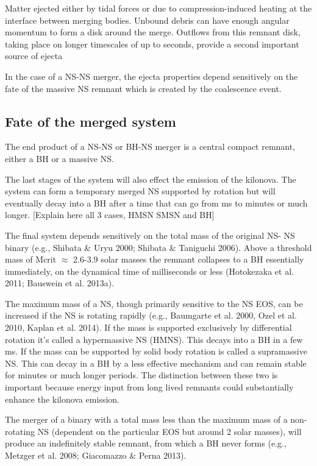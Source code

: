 Matter ejected either by tidal forces or due to compression-induced heating at the interface between merging bodies.
Unbound debris can have enough angular momentum to form a disk around the merge.
Outflows from this remnant disk, taking place on longer timescales of up to seconds, provide a second important source of ejecta

In the case of a NS-NS merger, the ejecta properties depend sensitively on the fate of the massive NS remnant which is created by the coalescence event.

\subsection{Fate of the merged system}

The end product of a NS-NS or BH-NS merger is a central compact remnant, either a BH or a massive NS. 

The last stages of the system will also effect the emission of the kilonova.
The system can form a temporary merged NS supported by rotation but will eventually decay into a BH after a time that can go from ms to minutes or much longer. [Explain here all 3 cases, HMSN SMSN and BH]

The final system depends sensitively on the total mass of the original NS- NS binary (e.g., Shibata \& Uryu 2000; Shibata \& Taniguchi 2006). Above a threshold mass of Mcrit $\approx$ 2.6-3.9 solar masses the remnant collapses to a BH essentially immediately, on the dynamical time of milliseconds or less (Hotokezaka et al. 2011; Bauswein et al. 2013a).

The maximum mass of a NS, though primarily sensitive to the NS EOS, can be increased if the NS is rotating rapidly (e.g., Baumgarte et al. 2000, Ozel et al. 2010, Kaplan et al. 2014).
If the mass is supported exclusively by differential rotation it's called a hypermassive NS (HMNS).
This decays into a BH in a few ms.
If the mass can be supported by solid body rotation is called a supramassive NS.
This can decay in a BH by a less effective mechanism and can remain stable for minutes or much longer periods.
The distinction between these two is important because energy input from long lived remnants could substantially enhance the kilonova emission.

The merger of a binary with a total mass less than the maximum mass of a non-rotating NS (dependent on the particular EOS but around 2 solar masses), will produce an indefinitely stable remnant, from which a BH never forms (e.g., Metzger et al. 2008; Giacomazzo \& Perna 2013).



